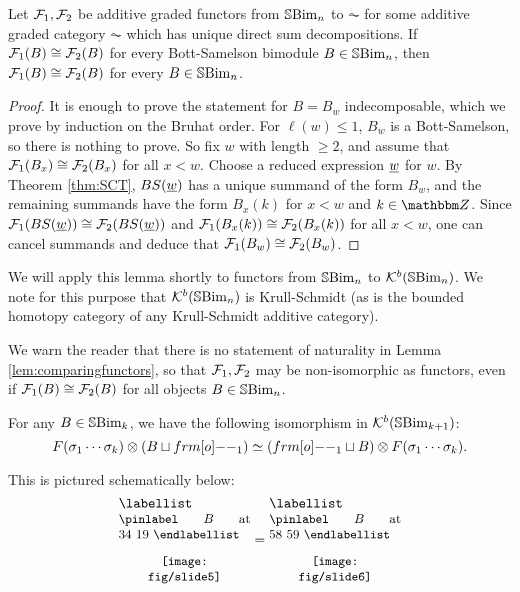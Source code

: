 \begin{lemma}\label{lem:comparingfunctors}
Let ${\mathcal{F}}_1,{\mathcal{F}}_2$ be additive graded functors from ${\mathbb{S}}{\rm Bim }_n$ to $\AC$ for some additive graded category $\AC$ which has unique direct sum decompositions.  If ${\mathcal{F}}_1(B)\cong {\mathcal{F}}_2(B)$ for every Bott-Samelson bimodule $B\in {\mathbb{S}}{\rm Bim }_n$, then ${\mathcal{F}}_1(B)\cong {\mathcal{F}}_2(B)$ for every $B\in {\mathbb{S}}{\rm Bim }_n$.
\end{lemma}

\begin{proof} It is enough to prove the statement for $B = B_w$ indecomposable, which we prove by induction on the Bruhat order. For $\ell(w) \le 1$, $B_w$ is a Bott-Samelson, so there
is nothing to prove. So fix $w$ with length $\ge 2$, and assume that ${\mathcal{F}}_1(B_x) \cong {\mathcal{F}}_2(B_x)$ for all $x < w$. Choose a reduced expression $\underline{w}$ for $w$. By Theorem
\ref{thm:SCT}, $BS(\underline{w})$ has a unique summand of the form $B_w$, and the remaining summands have the form $B_x(k)$ for $x < w$ and $k \in \Z$. Since ${\mathcal{F}}_1(BS(\underline{w})) \cong
{\mathcal{F}}_2(BS(\underline{w}))$ and ${\mathcal{F}}_1(B_x(k)) \cong {\mathcal{F}}_2(B_x(k))$ for all $x < w$, one can cancel summands and deduce that ${\mathcal{F}}_1(B_w) \cong {\mathcal{F}}_2(B_w)$. \end{proof}

We will apply this lemma shortly to functors from ${\mathbb{S}}{\rm Bim }_n$ to ${\mathcal{K}}^b({\mathbb{S}}{\rm Bim }_n)$. We note for this purpose that ${\mathcal{K}}^b({\mathbb{S}}{\rm Bim }_n)$ is Krull-Schmidt (as is the bounded homotopy category of any Krull-Schmidt additive category).

\begin{remark}
We warn the reader that there is no statement of naturality in Lemma \ref{lem:comparingfunctors}, so that ${\mathcal{F}}_1,{\mathcal{F}}_2$ may be non-isomorphic as functors, even if ${\mathcal{F}}_1(B)\cong {\mathcal{F}}_2(B)$ for all objects $B\in {\mathbb{S}}{\rm Bim }_n$.
\end{remark}

\begin{proposition}\label{prop:slidingBimodules}
For any $B\in {\mathbb{S}}{\rm Bim }_k$, we have the following isomorphism in ${\mathcal{K}}^b({\mathbb{S}}{\rm Bim }_{k+1})$:
\begin{equation}\label{eq:slidingBimodules}
F(\sigma_1\cdots \sigma_k) \otimes (B\sqcup \one_1)\simeq (\one_1\sqcup B)\otimes F(\sigma_1\cdots \sigma_k).
\end{equation}
\end{proposition}

This is pictured schematically below:
\[
\begin{minipage}{1.3in}
\labellist
\small
\pinlabel $B$ at 34 19
\endlabellist
\begin{center}\texttt{[image: fig/slide5]}\end{center}
\end{minipage}
=
\begin{minipage}{1.3in}
\labellist
\small
\pinlabel $B$ at 58 59
\endlabellist
\begin{center}\texttt{[image: fig/slide6]}\end{center}
\end{minipage}
\]

